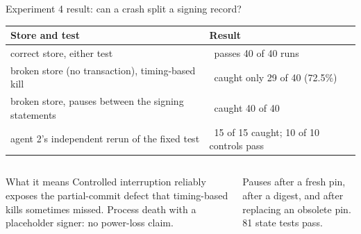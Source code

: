 \documentclass[aspectratio=169,10pt]{beamer}
\newcommand{\cmark}{\textcolor{okgreen}{\ding{51}}}
\newcommand{\xmark}{\textcolor{badred!80}{\ding{55}}}
\begin{document}
\begin{frame}{Experiment 4 result: can a crash split a signing record?}
\vspace{0.3em}
\footnotesize
\renewcommand{\arraystretch}{1.2}
\begin{tabular}{@{}L{0.47\textwidth} L{0.50\textwidth}@{}}
\toprule
\textbf{Store and test} & \textbf{Result} \\
\midrule
correct store, either test & \cmark\ passes 40 of 40 runs \\
broken store (no transaction), timing-based kill & \xmark\ caught only 29 of 40 (72.5\%) \\
broken store, pauses between the signing statements & \cmark\ caught 40 of 40 \\
agent 2's independent rerun of the fixed test & \cmark\ 15 of 15 caught; 10 of 10 controls pass \\
\bottomrule
\end{tabular}

\vspace{0.6em}
\begin{columns}[T,onlytextwidth]
\begin{alertblock}{What it means}
\scriptsize Controlled interruption reliably exposes the partial-commit defect that timing-based kills sometimes missed. Process death with a placeholder signer: no power-loss claim.
\end{alertblock}
\scriptsize\color{datagray}
Pauses after a fresh pin, after a digest, and after replacing an obsolete pin. 81 state tests pass.\\[3pt]
\end{columns}
\end{frame}
\end{document}
